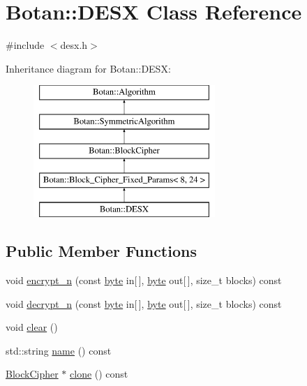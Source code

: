 \hypertarget{classBotan_1_1DESX}{\section{Botan\-:\-:D\-E\-S\-X Class Reference}
\label{classBotan_1_1DESX}
}


{\ttfamily \#include $<$desx.\-h$>$}

Inheritance diagram for Botan\-:\-:D\-E\-S\-X\-:\begin{figure}[H]
\begin{center}
\leavevmode
\includegraphics[height=5.000000cm]{classBotan_1_1DESX}
\end{center}
\end{figure}
\subsection*{Public Member Functions}
\begin{DoxyCompactItemize}
\item 
void \hyperlink{classBotan_1_1DESX_a0d5b8d3533d6249bfa22b05ae867b935}{encrypt\-\_\-n} (const \hyperlink{namespaceBotan_a7d793989d801281df48c6b19616b8b84}{byte} in\mbox{[}$\,$\mbox{]}, \hyperlink{namespaceBotan_a7d793989d801281df48c6b19616b8b84}{byte} out\mbox{[}$\,$\mbox{]}, size\-\_\-t blocks) const 
\item 
void \hyperlink{classBotan_1_1DESX_a84b8b2a404f2f190b22c822a39bbf433}{decrypt\-\_\-n} (const \hyperlink{namespaceBotan_a7d793989d801281df48c6b19616b8b84}{byte} in\mbox{[}$\,$\mbox{]}, \hyperlink{namespaceBotan_a7d793989d801281df48c6b19616b8b84}{byte} out\mbox{[}$\,$\mbox{]}, size\-\_\-t blocks) const 
\item 
void \hyperlink{classBotan_1_1DESX_aea24f659e51e501c2e94a8e1610c4d36}{clear} ()
\item 
std\-::string \hyperlink{classBotan_1_1DESX_a2d632294450061ab741b6d37e79fcec1}{name} () const 
\item 
\hyperlink{classBotan_1_1BlockCipher}{Block\-Cipher} $\ast$ \hyperlink{classBotan_1_1DESX_a8ebb960f5344018c4cdfd78f777eaea4}{clone} () const 
\end{DoxyCompactItemize}
